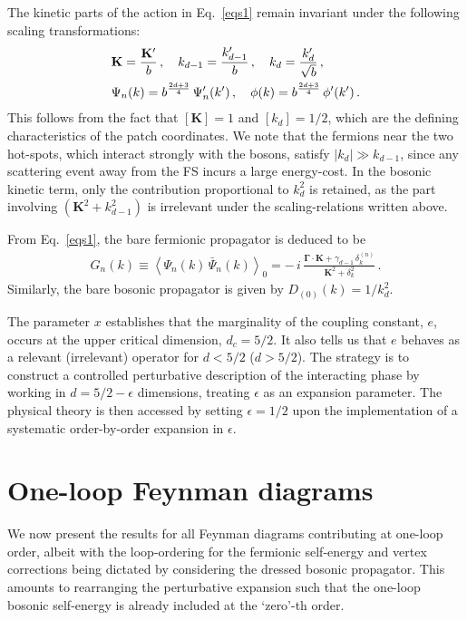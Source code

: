 The kinetic parts of the action in Eq.~\eqref{eqs1} remain 
invariant under the following scaling transformations:
\begin{align}
& \mathbf  K  =  \frac{\mathbf  K'}{b} \,, 
\quad k_{ d-1 } =\frac{k_{ d-1 }'}{b} \,,
\quad k_d = \frac{k_d'}{\sqrt{b}} \,,
\nonumber \\ &
\Psi_n (k)  =  b^{ \frac{2 d + 3} {4}}  \, \Psi'_n (k') \,, \quad 
\phi  (k) = b^{\frac{2 d + 3}{4}}  \, \phi' (k')\,.
 \end{align}
This follows from the fact that $[\mathbf{K}] = 1$ and $[k_d] = 1/2$, 
which are the defining characteristics of the patch coordinates. We note 
that the fermions near the two hot-spots, which interact strongly with 
the bosons, satisfy $|k_d| \gg k_{d-1}$, since any scattering event away 
from the FS incurs a large energy-cost. In the bosonic kinetic term, only 
the contribution proportional to $k_d^2$ is retained, as the part 
involving $(\mathbf{K}^2 + k_{d-1}^2)$ is irrelevant under the scaling-relations written above.

From Eq.~\eqref{eqs1}, the bare fermionic propagator is deduced to be
\begin{align}
\label{propf}
G_n(k) \equiv \left\langle \Psi_n(k)\,\bar{\Psi}_n(k) \right\rangle_0
= -\,i\,\frac{\boldsymbol{\Gamma} \cdot \mathbf{K} + 
\gamma_{d-1}\,\delta_k^{(n)}}{\mathbf{K}^2 + \delta_k^2}\,.
\end{align}
Similarly, the bare bosonic propagator is given by $D_{(0)}(k) = 1/k_d^2$.

The parameter $x$ establishes that the marginality of the coupling constant, 
$e$, occurs at the upper critical dimension, $d_c = 5/2$. It also tells us that $e$ 
behaves as a relevant (irrelevant) operator for $d < 5/2$ ($d > 5/2$). 
The strategy is to construct a controlled perturbative 
description of the interacting phase by working in $d = 5/2 - \epsilon$ 
dimensions, treating $\epsilon$ as an expansion parameter. The physical 
theory is then accessed by setting $\epsilon = 1/2$ 
upon the implementation of a systematic order-by-order expansion in $\epsilon$.

\section{One-loop Feynman diagrams}
\label{seconeloop}



We now present the results for all Feynman diagrams contributing at 
one-loop order, albeit with the loop-ordering for the fermionic self-energy and vertex corrections being dictated by considering the dressed bosonic propagator. This amounts to rearranging the perturbative expansion such that the one-loop bosonic self-energy
is already included at the `zero'-th order.


